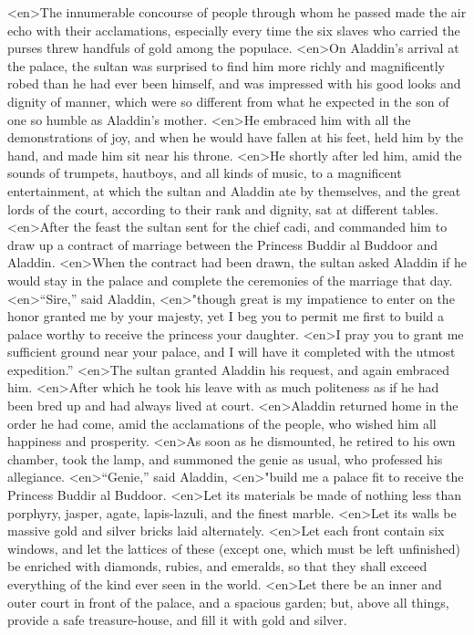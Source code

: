 <en>The innumerable concourse of people through whom he passed made the air echo with their acclamations, especially every time the six slaves who carried the purses threw handfuls of gold among the populace.
<en>On Aladdin’s arrival at the palace, the sultan was surprised to find him more richly and magnificently robed than he had ever been himself, and was impressed with his good looks and dignity of manner, which were so different from what he expected in the son of one so humble as Aladdin’s mother.
<en>He embraced him with all the demonstrations of joy, and when he would have fallen at his feet, held him by the hand, and made him sit near his throne.
<en>He shortly after led him, amid the sounds of trumpets, hautboys, and all kinds of music, to a magnificent entertainment, at which the sultan and Aladdin ate by themselves, and the great lords of the court, according to their rank and dignity, sat at different tables.
<en>After the feast the sultan sent for the chief cadi, and commanded him to draw up a contract of marriage between the Princess Buddir al Buddoor and Aladdin.
<en>When the contract had been drawn, the sultan asked Aladdin if he would stay in the palace and complete the ceremonies of the marriage that day.
<en>“Sire,” said Aladdin,
<en>"though great is my impatience to enter on the honor granted me by your majesty, yet I beg you to permit me first to build a palace worthy to receive the princess your daughter.
<en>I pray you to grant me sufficient ground near your palace, and I will have it completed with the utmost expedition.”
<en>The sultan granted Aladdin his request, and again embraced him.
<en>After which he took his leave with as much politeness as if he had been bred up and had always lived at court.
<en>Aladdin returned home in the order he had come, amid the acclamations of the people, who wished him all happiness and prosperity.
<en>As soon as he dismounted, he retired to his own chamber, took the lamp, and summoned the genie as usual, who professed his allegiance.
<en>“Genie,” said Aladdin,
<en>"build me a palace fit to receive the Princess Buddir al Buddoor.
<en>Let its materials be made of nothing less than porphyry, jasper, agate, lapis-lazuli, and the finest marble.
<en>Let its walls be massive gold and silver bricks laid alternately.
<en>Let each front contain six windows, and let the lattices of these (except one, which must be left unfinished) be enriched with diamonds, rubies, and emeralds, so that they shall exceed everything of the kind ever seen in the world.
<en>Let there be an inner and outer court in front of the palace, and a spacious garden; but, above all things, provide a safe treasure-house, and fill it with gold and silver.
